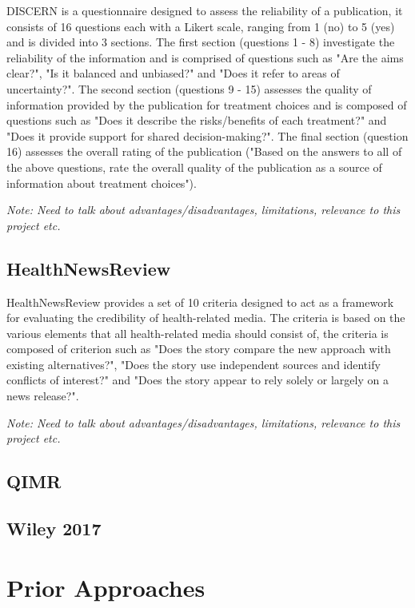 \documentclass[a4paper,twoside,phd]{BYUPhys}
\begin{document}
DISCERN is a questionnaire designed to assess the reliability of a publication, it consists of 16 questions each with a Likert scale, ranging from 1 (no) to 5 (yes) and is divided into 3 sections. The first section (questions 1 - 8) investigate the reliability of the information and is comprised of questions such as "Are the aims clear?", "Is it balanced and unbiased?" and "Does it refer to areas of uncertainty?". The second section (questions 9 - 15) assesses the quality of information provided by the publication for treatment choices and is composed of questions such as "Does it describe the risks/benefits of each treatment?" and "Does it provide support for shared decision-making?". The final section (question 16) assesses the overall rating of the publication ("Based on the answers to all of the above questions, rate the overall quality of the publication as a source of information about treatment choices").

\textit{Note: Need to talk about advantages/disadvantages, limitations, relevance to this project etc.}

\subsection{HealthNewsReview}
\label{sec:HealthNewsReview}

HealthNewsReview provides a set of 10 criteria designed to act as a framework for evaluating the credibility of health-related media. The criteria is based on the various elements that all health-related media should consist of, the criteria is composed of criterion such as "Does the story compare the new approach with existing alternatives?", "Does the story use independent sources and identify conflicts of interest?" and "Does the story appear to rely solely or largely on a news release?".

\textit{Note: Need to talk about advantages/disadvantages, limitations, relevance to this project etc.}

\subsection{QIMR}
\label{sec:QIMR}



\subsection{Wiley 2017}


\section{Prior Approaches}
\label{sec:PriorApproaches}
\end{document}
